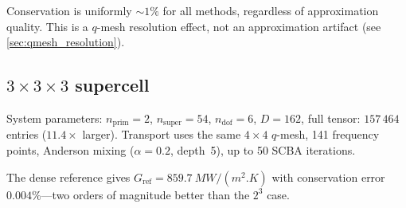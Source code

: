 \documentclass[11pt]{article}
\newcommand{\ndof}{n_{\mathrm{dof}}}
\newcommand{\nprim}{n_{\mathrm{prim}}}
\newcommand{\nsuper}{n_{\mathrm{super}}}
\begin{document}
Conservation is uniformly ${\sim}1\%$ for all methods, regardless of
approximation quality.  This is a $q$-mesh resolution effect, not an
approximation artifact (see \cref{sec:qmesh_resolution}).


\subsection{$3\times3\times3$ supercell}
\label{sec:results_333}

System parameters: $\nprim = 2$, $\nsuper = 54$, $\ndof = 6$,
$D = 162$, full tensor: $157\,464$ entries ($11.4\times$ larger).
Transport uses the same $4\times4$ $q$-mesh, 141 frequency points,
Anderson mixing ($\alpha = 0.2$, depth~5), up to 50 SCBA iterations.

The dense reference gives
$G_\mathrm{ref} = \SI{859.7}{MW/(m^2.K)}$ with conservation error
$0.004\%$---two orders of magnitude better than the $2^3$ case.
\end{document}

